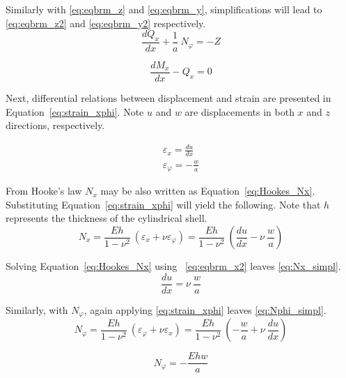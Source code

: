 Similarly with \ref{eq:eqbrm_z} and \ref{eq:eqbrm_y}, simplifications will lead to \ref{eq:eqbrm_z2} and \ref{eq:eqbrm_y2} respectively.
\begin{equation}
	\label{eq:eqbrm_z2}
	\frac{dQ_x}{dx}+\frac{1}{a}\ N_\varphi = -Z
\end{equation}

\begin{equation}
	\label{eq:eqbrm_y2}
	\frac{dM_x}{dx}- Q_x= 0
\end{equation} 

Next, differential relations between displacement and strain are presented in Equation~\ref{eq:strain_xphi}. Note $u$ and $w$ are displacements in both $x$ and $z$ directions, respectively.

\begin{equation}
	\label{eq:strain_xphi}
	\begin{aligned}
		\varepsilon_x = \frac{du}{dx}      \\
		\varepsilon_\varphi = -\frac{w}{a} 
	\end{aligned}
\end{equation}

From Hooke's law $N_x$ may be also written as Equation~\ref{eq:Hookes_Nx}. Substituting Equation~\ref{eq:strain_xphi} will yield the following. Note that $h$ represents the thickness of the cylindrical shell.
\begin{equation}
	\label{eq:Hookes_Nx}
	N_x = \frac{Eh}{1-\nu^2}\ \left( \varepsilon_x + \nu \varepsilon_\varphi \right) =  \frac{Eh}{1-\nu^2}\ \left( \frac{du}{dx} -\nu \ \frac{w}{a} \right)
\end{equation} 

Solving Equation~\ref{eq:Hookes_Nx} using ~\ref{eq:eqbrm_x2} leaves \ref{eq:Nx_simpl}.
\begin{equation}
	\label{eq:Nx_simpl}
	\frac{du}{dx} =  \nu \ \frac{w}{a}
\end{equation} 

Similarly, with $N_\varphi$, again applying \ref{eq:strain_xphi} leaves \ref{eq:Nphi_simpl}.
\begin{equation}
	\label{eq:Hookes_Nphi}
	N_\varphi = \frac{Eh}{1-\nu^2}\ \left( \varepsilon_\varphi + \nu \varepsilon_x \right) = \frac{Eh}{1-\nu^2}\  \left( -\frac{w}{a}+\nu \ \frac{du}{dx} \right)
\end{equation} 

\begin{equation}
	\label{eq:Nphi_simpl}
	N_\varphi = - \frac{Ehw}{a}
\end{equation}

